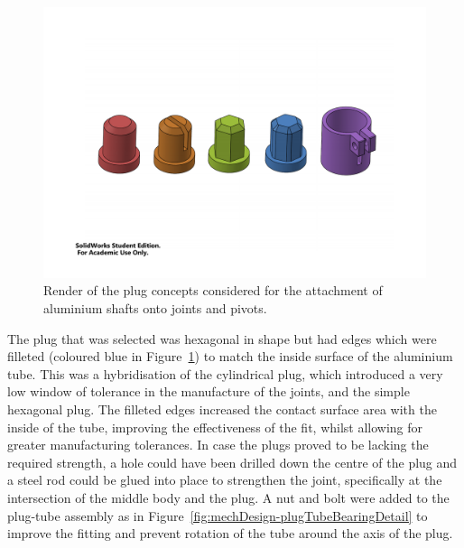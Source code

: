         \begin{figure}
        \centering
        \includegraphics[clip, trim=3cm 6cm 3cm 6cm, width=1\linewidth]{figures/plug-concepts}
        \caption[Render of the plug concepts considered for the attachment of aluminium shafts onto joints and pivots.]{Render of the plug concepts considered for the attachment of aluminium shafts onto joints and pivots.}
        \label{fig:mechDesign-plugConcepts}
        \end{figure}
        
        The plug that was selected was hexagonal in shape but had edges which were filleted (coloured blue in Figure~\ref{fig:mechDesign-plugConcepts}) to match the inside surface of the aluminium tube. This was a hybridisation of the cylindrical plug, which introduced a very low window of tolerance in the manufacture of the joints, and the simple hexagonal plug. The filleted edges increased the contact surface area with the inside of the tube, improving the effectiveness of the fit, whilst allowing for greater manufacturing tolerances. In case the plugs proved to be lacking the required strength, a hole could have been drilled down the centre of the plug and a steel rod could be glued into place to strengthen the joint, specifically at the intersection of the middle body and the plug. A nut and bolt were added to the plug-tube assembly as in Figure~\ref{fig:mechDesign-plugTubeBearingDetail} to improve the fitting and prevent rotation of the tube around the axis of the plug.
        
